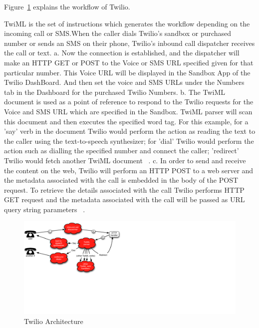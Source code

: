 Figure~\ref{f:architecture} explains the workflow of Twilio.
  

TwiML is the set of instructions which generates the workflow depending on the 
incoming call or SMS.When the caller dials Twilio’s sandbox or purchased number 
or sends an SMS on their phone, Twilio’s inbound call dispatcher receives the 
call or text. 
a. Now the connection is established, and the dispatcher will make an HTTP GET 
or POST to the Voice or SMS URL specified given for that particular number. 
This Voice URL will be displayed in the Sandbox App of the Twilio DashBoard. 
And then set the voice and SMS URLs under the Numbers tab in the Dashboard for 
the purchased Twilio Numbers.
b. The TwiML document is used as a point of reference to respond to the Twilio 
requests for the Voice and SMS URL which are specified in the Sandbox. TwiML 
parser will scan this document and then executes the specified word tag. For 
this example, for a 'say' verb in the document Twilio would perform the action 
as reading the text to the caller using the text-to-speech synthesizer; for 
'dial' Twilio would perform the action such as dialling the specified number 
and connect the caller; 'redirect' Twilio would fetch another TwiML document
~\cite{hid-sp18-406-twilio-architecture2}.
c. In order to send and receive the content on the web, Twilio will perform an 
HTTP POST to a web server and the metadata associated with the call is embedded
in the body of the POST request. To retrieve the details associated with the 
call Twilio performs HTTP GET request and the metadata associated with the call
will be passed as URL query string parameters
~\cite{hid-sp18-406-twilio-architecture3}.


\begin{figure}[!ht]
  \centering\includegraphics[width=\columnwidth]{image/Twilio-Architecture.PNG}
  \caption{Twilio Architecture~\cite{hid-sp18-406-twilio-architecture-image}}
\label{f:architecture}
\end{figure}


